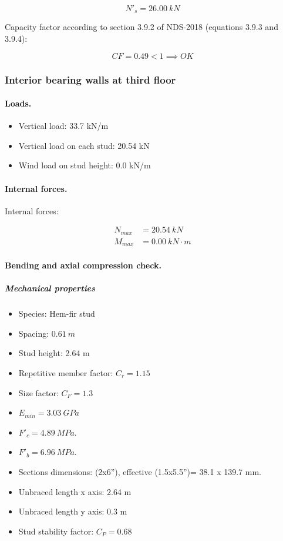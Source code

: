 \begin{equation}
  N'_s= 26.00\ kN
\end{equation}

\noindent Capacity factor according to section 3.9.2 of NDS-2018 (equations 3.9.3 and 3.9.4):

\begin{equation}
  CF= 0.49 < 1 \implies OK
\end{equation}

\subsubsection{Interior bearing walls at third floor}

\paragraph{Loads.}

\begin{itemize}
\item Vertical load: 33.7 kN/m
\item Vertical load on each stud: 20.54 kN
\item Wind load on stud height: 0.0 kN/m
\end{itemize}

\paragraph{Internal forces.}

\noindent Internal forces:

\begin{align}
  N_{max}&= 20.54\ kN \\
  M_{max}&= 0.00\ kN \cdot m
\end{align}

\paragraph{Bending and axial compression check.}

\subparagraph{Mechanical properties}

\begin{itemize}
\item Species: Hem-fir stud
\item Spacing: $0.61\ m$
\item Stud height: 2.64 m
\item Repetitive member factor: $C_r= 1.15$
\item Size factor: $C_F= 1.3$
\item $E_{min}= 3.03\ GPa$
\item $F'_c= 4.89\ MPa$.
\item $F'_b= 6.96\ MPa$.
\item Sections dimensions: (2x6''), effective (1.5x5.5'')= 38.1 x 139.7  mm.
\item Unbraced length x axis: 2.64 m
\item Unbraced length y axis: 0.3 m
\item Stud stability factor: $C_P= 0.68$
\end{itemize}

